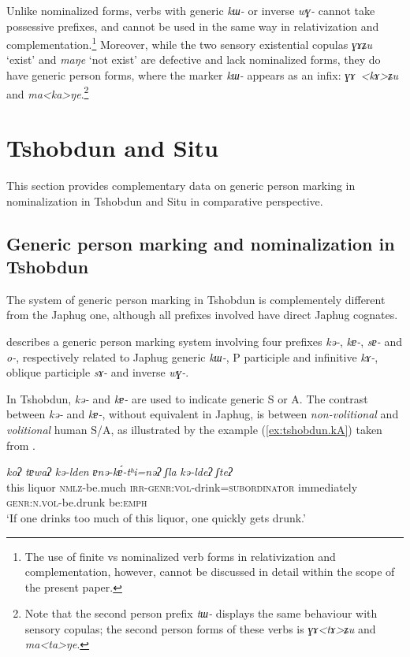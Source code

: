 \documentclass[oneside,a4paper,11pt]{article}
\newcommand{\ipa}[1]{\textit{\phon\mbox{#1}}} %
\newcommand{\refb}[1]{(\ref{#1})}
\begin{document}
Unlike nominalized forms,  verbs with generic \ipa{kɯ-} or   inverse \ipa{wɣ-} cannot take possessive prefixes, and cannot be used in the same way in relativization and complementation.\footnote{The use of finite vs nominalized verb forms in relativization and complementation, however, cannot be discussed in detail within the scope of the present paper.} Moreover, while the  two sensory existential copulas \ipa{ɣɤʑu} `exist' and \ipa{maŋe} `not exist'  are defective and lack nominalized forms, they do have generic person forms, where the marker \ipa{kɯ-}   appears  as an infix: \ipa{ɣɤ
<kɤ>ʑu} and \ipa{ma<ka>ŋe}.\footnote{Note that the second person prefix \ipa{tɯ-} displays the same behaviour with sensory copulas; the second person forms of these verbs is \ipa{ɣɤ<tɤ>ʑu} and \ipa{ma<ta>ŋe}. } 

 \section{Tshobdun and Situ}

This section provides complementary data on generic person marking in nominalization in Tshobdun and Situ in comparative perspective.

\subsection{Generic person marking and nominalization in Tshobdun} \label{tshobdun.genr}
The system of generic person marking in Tshobdun is complementely different from the Japhug one, although all prefixes involved have direct Japhug cognates.

\citet{sun14generic} describes a generic person marking system involving four prefixes \ipa{kə-}, \ipa{kɐ-}, \ipa{sɐ-} and \ipa{o-}, respectively related to Japhug generic  \ipa{kɯ-}, P participle and infinitive \ipa{kɤ-}, oblique participle \ipa{sɤ-} and inverse \ipa{wɣ-}. 

In Tshobdun, \ipa{kə-} and \ipa{kɐ-} are used to indicate generic S or A. The contrast between \ipa{kə-} and \ipa{kɐ-}, without equivalent in Japhug, is between 	 \textit{non-volitional} and  \textit{volitional} human S/A, as illustrated by the example \refb{ex:tshobdun.kA} taken from \citet[238]{sun14generic}.
 \begin{exe}
\ex \label{ex:tshobdun.kA}
\gll
\ipa{koʔ}  	\ipa{tɐwaʔ}  	\ipa{kə-lden}  	\ipa{ɐnə-kɐ́-tʰi=nəʔ}  	\ipa{ʃla}  	\ipa{kə-ldeʔ}  	\ipa{ʃteʔ}   \\
 this liquor \textsc{nmlz}-be.much \textsc{irr-genr:vol}-drink=\textsc{subordinator}  immediately \textsc{genr:n.vol}-be.drunk be:\textsc{emph} \\
\glt  ‘If one drinks too much of this liquor, one quickly gets drunk.’ 
 \end{exe}
 
\end{document}
